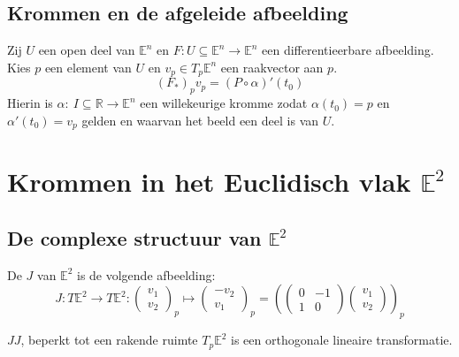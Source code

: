 \documentclass[main.tex]{subfiles}
\begin{document}
\section{Krommen en de afgeleide afbeelding}
\label{sec:krommen-en-de}


\begin{st}
  Zij $U$ een open deel van $\mathbb{E}^{n}$ en $F: U \subseteq \mathbb{E}^{n} \rightarrow \mathbb{E}^{n}$ een differentieerbare afbeelding.
  Kies $p$ een element van $U$ en $v_{p}\in T_{p}\mathbb{E}^{n}$ een raakvector aan $p$.
  \[ (F_{*})_{p}v_{p} = (P \circ \alpha)'(t_{0}) \]
  Hierin is $\alpha:\ I \subseteq \mathbb{R} \rightarrow \mathbb{E}^{n}$ een willekeurige kromme zodat $\alpha(t_{0}) = p$ en $\alpha'(t_{0}) = v_{p}$ gelden en waarvan het beeld een deel is van $U$.
\end{st}


\chapter{Krommen in het Euclidisch vlak $\mathbb{E}^{2}$}
\label{cha:kromm-het-eucl}

\section{De complexe structuur van $\mathbb{E}^{2}$}
\label{sec:de-compl-struct}

\begin{de}
  De  $J$ van $\mathbb{E}^{2}$ is de volgende afbeelding:
  \[
  J: T\mathbb{E}^{2} \rightarrow T\mathbb{E}^{2}: 
  \begin{pmatrix}
    v_{1}\\v_{2}
  \end{pmatrix}_{p}
  \mapsto
  \begin{pmatrix}
    -v_{2}\\v_{1}
  \end{pmatrix}_{p}
  =
  \left(
    \begin{pmatrix}
      0 & -1\\
      1 & 0
    \end{pmatrix}
    \begin{pmatrix}
      v_{1}\\v_{2}
    \end{pmatrix}
  \right)_{p}
  \]
\end{de}

\begin{st}
  $JJ$, beperkt tot een rakende ruimte $T_{p}\mathbb{E}^{2}$  is een orthogonale lineaire transformatie.
\end{st}
\end{document}
